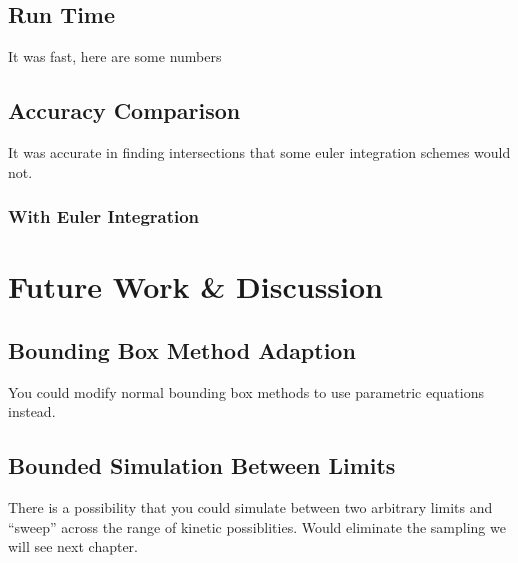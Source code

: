 	\subsection{Run Time}

	It was fast, here are some numbers

	\subsection{Accuracy Comparison}

	It was accurate in finding intersections that some euler integration schemes would not.

		\subsubsection{With Euler Integration}

\section{Future Work \& Discussion}

	\subsection{Bounding Box Method Adaption}

	You could modify normal bounding box methods to use parametric equations instead.

	\subsection{Bounded Simulation Between Limits}

	There is a possibility that you could simulate between two arbitrary limits and ``sweep'' across the range of kinetic possiblities. Would eliminate the sampling we will see next chapter.
